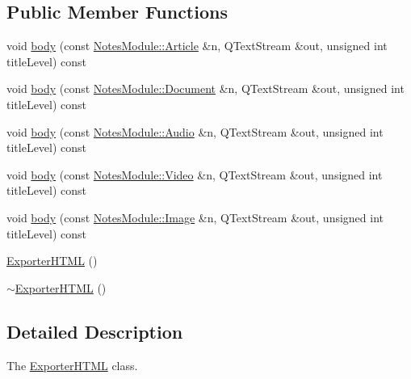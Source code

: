 \subsection*{Public Member Functions}
\begin{DoxyCompactItemize}
\item 
void \hyperlink{classexport__notes_1_1_exporter_h_t_m_l_a768f1b20f5ccb99e98ede2574e018a06}{body} (const \hyperlink{class_notes_module_1_1_article}{Notes\-Module\-::\-Article} \&n, Q\-Text\-Stream \&out, unsigned int title\-Level) const 
\item 
void \hyperlink{classexport__notes_1_1_exporter_h_t_m_l_a8cb17dcb89bc8a05d8eae441c54f3681}{body} (const \hyperlink{class_notes_module_1_1_document}{Notes\-Module\-::\-Document} \&n, Q\-Text\-Stream \&out, unsigned int title\-Level) const 
\item 
void \hyperlink{classexport__notes_1_1_exporter_h_t_m_l_a4d35e42a217e8ef64f3d5f91b5c45275}{body} (const \hyperlink{class_notes_module_1_1_audio}{Notes\-Module\-::\-Audio} \&n, Q\-Text\-Stream \&out, unsigned int title\-Level) const 
\item 
void \hyperlink{classexport__notes_1_1_exporter_h_t_m_l_af4f575dd428046f72221e1490d4dd0c6}{body} (const \hyperlink{class_notes_module_1_1_video}{Notes\-Module\-::\-Video} \&n, Q\-Text\-Stream \&out, unsigned int title\-Level) const 
\item 
void \hyperlink{classexport__notes_1_1_exporter_h_t_m_l_a600d95862e7ebe0aecea6568900089f2}{body} (const \hyperlink{class_notes_module_1_1_image}{Notes\-Module\-::\-Image} \&n, Q\-Text\-Stream \&out, unsigned int title\-Level) const 
\item 
\hyperlink{classexport__notes_1_1_exporter_h_t_m_l_a526397a3568f9c1aa5baaada3be21333}{Exporter\-H\-T\-M\-L} ()
\item 
\hyperlink{classexport__notes_1_1_exporter_h_t_m_l_af6947df5347c2f36dac637c7f8007088}{$\sim$\-Exporter\-H\-T\-M\-L} ()
\end{DoxyCompactItemize}


\subsection{Detailed Description}
The \hyperlink{classexport__notes_1_1_exporter_h_t_m_l}{Exporter\-H\-T\-M\-L} class. 

